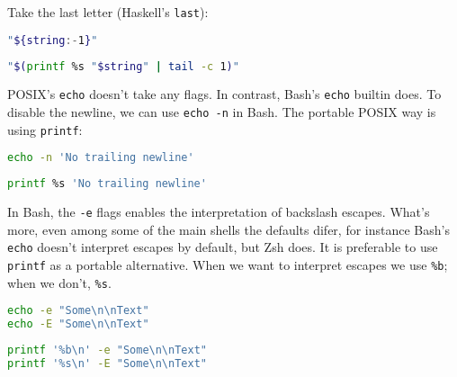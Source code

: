 \documentclass{article}
\begin{document}
Take the last letter (Haskell's {\tt last}):

\begin{minipage}{.5\textwidth}
\begin{lstlisting}[language=sh]
"${string:-1}"
\end{lstlisting}
\end{minipage}%
\begin{minipage}{.5\textwidth}
\begin{lstlisting}[language=bash]
"$(printf %s "$string" | tail -c 1)"
\end{lstlisting}
\end{minipage}

POSIX's {\tt echo} doesn't take any flags. In contrast, Bash's {\tt echo}
builtin does. To disable the newline, we can use {\tt echo -n} in Bash. The
portable POSIX way is using {\tt printf}:

\begin{minipage}[b]{.5\textwidth}
\begin{lstlisting}[language=sh]
echo -n 'No trailing newline'
\end{lstlisting}
\end{minipage}%
\begin{minipage}[b]{.5\textwidth}
\begin{lstlisting}[language=bash]
  printf %s 'No trailing newline'
\end{lstlisting}
\end{minipage}

In Bash, the {\tt -e} flags enables the interpretation of backslash escapes.
What's more, even among some of the main shells the defaults difer, for instance
Bash's {\tt echo} doesn't interpret escapes by default, but Zsh does. It is
preferable to use {\tt printf} as a portable alternative. When we want to
interpret escapes we use {\tt \%b}; when we don't, {\tt \%s}.

\begin{minipage}[b]{.5\textwidth}
\begin{lstlisting}[language=sh]
echo -e "Some\n\nText"
echo -E "Some\n\nText"
\end{lstlisting}
\end{minipage}%
\begin{minipage}[b]{.5\textwidth}
\begin{lstlisting}[language=bash]
printf '%b\n' -e "Some\n\nText"
printf '%s\n' -E "Some\n\nText"
\end{lstlisting}
\end{minipage}
\end{document}
